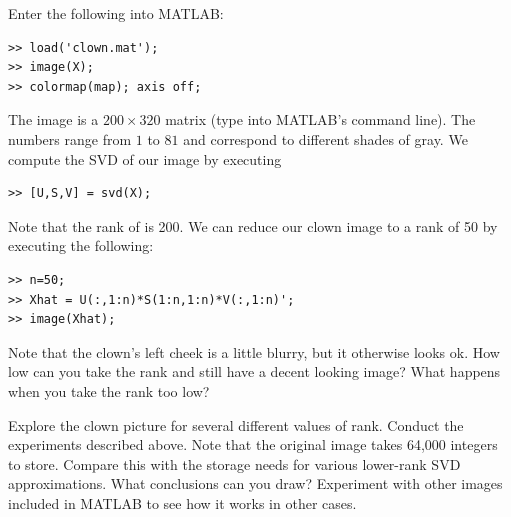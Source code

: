 \begin{matlab}
 Enter the following into MATLAB:
\begin{lstlisting}[style=matlab]
>> load('clown.mat');
>> image(X);
>> colormap(map); axis off;
\end{lstlisting}
The image  is a $200\times 320$ matrix (type 
into MATLAB's command line).  The numbers range from $1$ to $81$ and
correspond to different shades of gray.  We compute the SVD of our
image  by executing
\begin{lstlisting}[style=matlab]
>> [U,S,V] = svd(X);
\end{lstlisting}
Note that the rank of  is 200.  We can reduce our clown image
to a rank of 50 by executing the following:
\begin{lstlisting}[style=matlab]
>> n=50;
>> Xhat = U(:,1:n)*S(1:n,1:n)*V(:,1:n)';
>> image(Xhat);
\end{lstlisting}
Note that the clown's left cheek is a little blurry, but it
otherwise looks ok.  How low can you take the rank and still have a
decent looking image?  What happens when you take the rank too low?

\begin{problem}
Explore the clown picture for several different values of rank.
Conduct the experiments described above.  Note that the original
image takes 64,000 integers to store.  Compare this with the storage
needs for various lower-rank SVD approximations. What conclusions
can you draw? Experiment with other images included in MATLAB to see how it works in other cases.
\end{problem}
\end{matlab}

